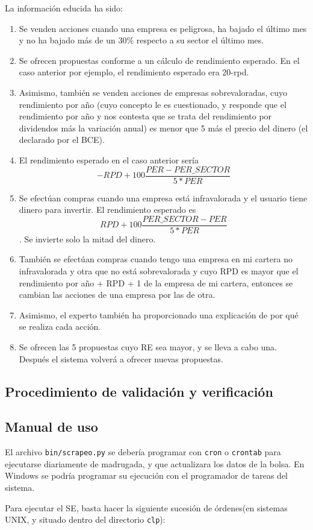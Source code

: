 \documentclass[a4paper,11pt]{article}
\begin{document}
La información educida ha sido:

\begin{enumerate}[$\rightarrow$]
 \item Se venden acciones cuando una empresa es peligrosa, ha bajado el último mes y no ha bajado más de un 30\% respecto 
 a su sector el último mes.
 \item Se ofrecen propuestas conforme a un cálculo de rendimiento esperado. En el caso anterior por ejemplo, el rendimiento
 esperado era 20-rpd.
 \item Asimismo, también se venden acciones de empresas sobrevaloradas, cuyo rendimiento por año (cuyo concepto
 le es cuestionado, y responde que el rendimiento por año y nos contesta que se trata del rendimiento por dividendos más la
 variación anual) es menor que 5 más el precio del dinero (el declarado por el BCE).
 \item El rendimiento esperado en el caso anterior sería $$-RPD + 100 \frac{PER - PER\_SECTOR}{5*PER}$$
 \item Se efectúan compras cuando una empresa está infravalorada y el usuario tiene dinero para invertir. El rendimiento esperado
 es $$RPD + 100 \frac{PER\_SECTOR - PER}{5*PER}$$. Se invierte solo la mitad del dinero.
 \item También se efectúan compras cuando tengo una empresa en mi cartera no infravalorada y otra que no está sobrevalorada
 y cuyo RPD es mayor que el rendimiento por año + RPD + 1 de la empresa de mi cartera, entonces se cambian las acciones de una
 empresa por las de otra.
 \item Asimismo, el experto también ha proporcionado una explicación de por qué se realiza cada acción.
 \item Se ofrecen las 5 propuestas cuyo RE sea mayor, y se lleva a cabo una. Después el sistema volverá a ofrecer nuevas propuestas.
\end{enumerate}


\subsection{Procedimiento de validación y verificación}


\subsection{Manual de uso}

El archivo \texttt{bin/scrapeo.py} se debería programar con \texttt{cron} o \texttt{crontab}
para ejecutarse diariamente de madrugada, y que actualizara los datos de la bolsa. En Windows se podría programar su ejecución 
con el programador de tareas del sistema.

Para ejecutar el SE, basta hacer la siguiente sucesión de órdenes(en sistemas UNIX, y situado dentro del directorio \texttt{clp}):
\end{document}
